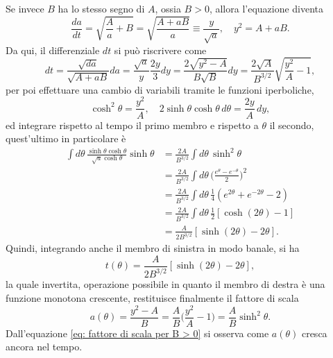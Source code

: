 Se invece $B$ ha lo stesso segno di $A$, ossia $B > 0$, allora l'equazione diventa
\begin{equation}
    \frac{da}{dt} = \sqrt{\frac{A}{a} + B} = \sqrt{\frac{A + aB}{a}} \equiv \frac{y}{\sqrt{a}},\quad y^2 = A + aB.
\end{equation}
Da qui, il differenziale $dt$ si può riscrivere come 
\begin{equation}
    dt = \frac{\sqrt{da}}{\sqrt{A + aB}}da = \frac{\sqrt{a}}{y}\frac{2y}{3}dy = \frac{2\sqrt{y^2 - A}}{B\sqrt{B}}dy = \frac{2\sqrt{A}}{B^{3/2}}\sqrt{\frac{y^2}{A} - 1},
\end{equation}
per poi effettuare una cambio di variabili tramite le funzioni iperboliche,
\begin{equation}
    \cosh^2{\theta} = \frac{y^2}{A},\quad 2\sinh{\theta}\cosh{\theta}\,d\theta = \frac{2y}{A}\,dy,
\end{equation}
ed integrare rispetto al tempo il primo membro e rispetto a $\theta$ il secondo, quest'ultimo in particolare è
\begin{equation}
    \begin{split}
        \int d\theta\, \frac{\sinh{\theta}\cosh{\theta}}{\sqrt{a}\cosh{\theta}}\sinh{\theta} &= \frac{2A}{B^{3/2}}\int d\theta\,\sinh^2{\theta} \\
        &= \frac{2A}{B^{3/2}}\int d\theta\,\bigg(\frac{e^{\theta} - e^{-\theta}}{2}\bigg)^2 \\
        &= \frac{2A}{B^{3/2}}\int d\theta\,\frac{1}{4}(e^{2\theta} + e^{-2\theta} - 2) \\
        &= \frac{2A}{B^{3/2}}\int d\theta\,\frac{1}{2}[\cosh{(2\theta)} - 1] \\
        &= \frac{A}{2B^{3/2}}[\sinh{(2\theta)} - 2\theta].
    \end{split} 
\end{equation}
Quindi, integrando anche il membro di sinistra in modo banale, si ha
\begin{equation}
    t(\theta) = \frac{A}{2B^{3/2}}[\sinh{(2\theta)} - 2\theta],
\end{equation}
la quale invertita, operazione possibile in quanto il membro di destra è una funzione monotona crescente, restituisce finalmente il fattore di scala
\begin{equation}
\label{eq: fattore di scala per B > 0}
    a(\theta) = \frac{y^2 - A}{B} = \frac{A}{B}\bigg(\frac{y^2}{A} - 1) = \frac{A}{B}\sinh^2{\theta}.
\end{equation}
Dall'equazione \eqref{eq: fattore di scala per B > 0} si osserva come $a(\theta)$ cresca ancora nel tempo.

